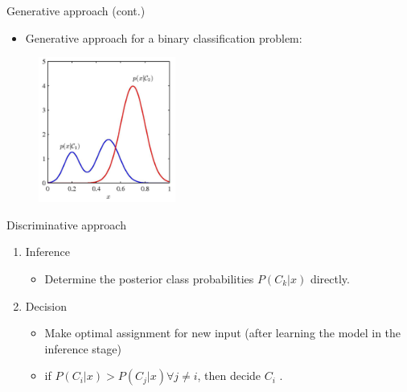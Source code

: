 \documentclass[serif, aspectratio=169]{beamer}
\begin{document}
    \begin{frame}{Generative approach (cont.)}

        \begin{itemize}
            \item Generative approach for a binary classification problem:
        \end{itemize}
        \begin{figure}[h]
            \centering
            \includegraphics[width=0.4\textwidth]{pic/Generative.png}
        \end{figure}
        \vfill
    \end{frame}
    \begin{frame}{Discriminative approach}
        \begin{enumerate}
            \item Inference
            \begin{itemize}
                \item Determine the posterior class probabilities $P(C_k|x)$ directly.
            \end{itemize}
            \item Decision
            \begin{itemize}
                \item Make optimal assignment for new input (after learning the model in the inference stage)
                \item if $P(C_i|x) > P(C_j|x) \forall j \neq i$, then decide $C_i$ .
            \end{itemize}
        \end{enumerate}
    \end{frame}
\end{document}
